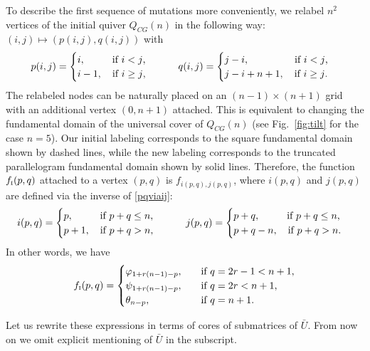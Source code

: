 \documentclass{amsart}
\theoremstyle{definition}
\theoremstyle{remark}
\numberwithin{equation}{section}
\numberwithin{theorem}{section}
\begin{document}
 To describe the first sequence of mutations more conveniently, we relabel $n^2$ vertices of the initial quiver $Q_{CG}(n)$ in the following way: $(i,j)\mapsto (p(i,j),q(i,j))$ with
\begin{equation}\label{pqviaij}
 p(i,j)=\begin{cases}
 i, \qquad \hskip 2.5mm \text{if $i<j$,}\\
 i-1, \quad \text{if $i\geq j$,}
 \end{cases}\qquad
 q(i,j)=\begin{cases}
 j-i, \qquad\qquad\hskip 2mm\text{if $i<j$,}\\
 j-i+n+1, \quad \text{if $i\geq j$.}
 \end{cases}
\end{equation}
The relabeled nodes can be naturally placed on  an $(n-1)\times (n+1)$ grid with an additional vertex $(0,n+1)$ attached.
This is equivalent to changing the fundamental domain of the universal cover of $Q_{CG}(n)$ (see Fig.~\ref{fig:tilt} for the case $n=5$). Our initial labeling corresponds to the square fundamental
domain shown by dashed lines, while the new labeling corresponds to the truncated parallelogram
fundamental domain shown by solid lines. Therefore, the function $f_{\mbox{\tiny\rm I}}(p,q)$ attached to a vertex $(p,q)$
is $f_{i(p,q),j(p,q)}$, where $i(p,q)$ and $j(p,q)$ are defined via the inverse of  \eqref{pqviaij}:
 \begin{equation*}
 i(p,q)=\begin{cases}
 p, \qquad \hskip 2.5mm \text{if $p+q\leq n$,}\\
 p+1, \quad \text{if $p+q >n$,}
 \end{cases}\qquad
 j(p,q)=\begin{cases}
 p+q, \qquad\hskip 2.5mm\text{if $p+q\leq n$,}\\
 p+q-n, \quad \text{if $p+q>n$.}
 \end{cases}
\end{equation*}
In other words, we have
\begin{equation}\label{fviaphi}
f_{\mbox{\tiny\rm I}}(p,q)=\begin{cases}
{{\varphi}}_{1+r(n-1)-p}, \quad&\text{if $q=2r-1<n+1$,}\\
{{\psi}}_{1+r(n-1)-p},  \quad&\text{if $q=2r<n+1$,}\\
\theta_{n-p}, \qquad&\text{if $q=n+1$.}
\end{cases}
\end{equation}

Let us rewrite these expressions in terms of cores of submatrices of $\bar U$. From now on we omit explicit mentioning
of $\bar U$ in the subscript.
\end{document}
